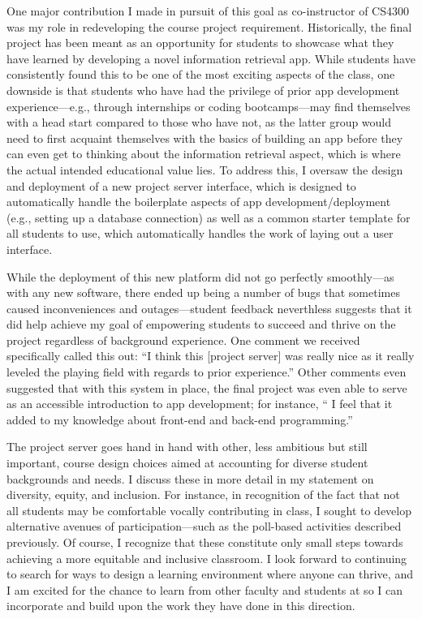 \documentclass[12pt,letterpaper]{article}
\begin{document}
One major contribution I made in pursuit of this goal as co-instructor of CS4300 was my role in redeveloping the course project requirement.
Historically, the final project has been meant as an opportunity for students to showcase what they have learned by developing a novel information retrieval app.
While students have consistently found this to be one of the most exciting aspects of the class, one downside is that students who have had the privilege of prior app development experience---e.g., through internships or coding bootcamps---may find themselves with a head start compared to those who have not, as the latter group would need to first acquaint themselves with the basics of building an app before they can even get to thinking about the information retrieval aspect, which is where the actual intended educational value lies.
To address this, I oversaw the design and deployment of a new project server interface, which is designed to automatically handle the boilerplate aspects of app development/deployment (e.g., setting up a database connection) as well as a common starter template for all students to use, which automatically handles the work of laying out a user interface.

While the deployment of this new platform did not go perfectly smoothly---as with any new software, there ended up being a number of bugs that sometimes caused inconveniences and outages---student feedback neverthless suggests that it did help achieve my goal of empowering students to succeed and thrive on the project regardless of background experience.
One comment we received specifically called this out: ``I think this [project server] was really nice as it really leveled the playing field with regards to prior experience.''
Other comments even suggested that with this system in place, the final project was even able to serve as an accessible introduction to app development; for instance, `` I feel that it added to my knowledge about front-end and back-end programming.''

The project server goes hand in hand with other, less ambitious but still important, course design choices aimed at accounting for diverse student backgrounds and needs.
\iflongdei
I discuss these in more detail in my statement on diversity, equity, and inclusion.
\else
For instance, in recognition of the fact that not all students may be comfortable vocally contributing in class, I sought to develop alternative avenues of participation---such as the poll-based activities described previously.
\fi
Of course, I recognize that these constitute only small steps towards achieving a more equitable and inclusive classroom.
I look forward to continuing to search for ways to design a learning environment where anyone can thrive, and I am excited for the chance to learn from other faculty and students at \schoolname so I can incorporate and build upon the work they have done in this direction.
\end{document}
